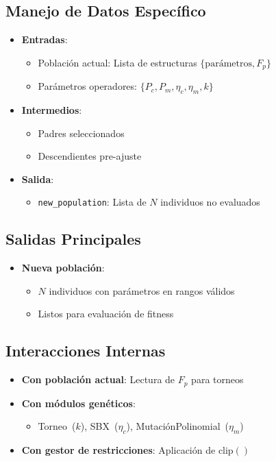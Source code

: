 \subsection*{Manejo de Datos Específico}
\begin{itemize}
    \item \textbf{Entradas}:
    \begin{itemize}
        \item Población actual: Lista de estructuras $\{\text{parámetros}, F_p\}$
        \item Parámetros operadores: $\{P_c, P_m, \eta_c, \eta_m, k\}$
    \end{itemize}

    \item \textbf{Intermedios}:
    \begin{itemize}
        \item Padres seleccionados
        \item Descendientes pre-ajuste
    \end{itemize}

    \item \textbf{Salida}:
    \begin{itemize}
        \item \texttt{new\_population}: Lista de $N$ individuos no evaluados
    \end{itemize}
\end{itemize}

\subsection*{Salidas Principales}
\begin{itemize}
    \item \textbf{Nueva población}:
    \begin{itemize}
        \item $N$ individuos con parámetros en rangos válidos
        \item Listos para evaluación de fitness
    \end{itemize}
\end{itemize}

\subsection*{Interacciones Internas}
\begin{itemize}
    \item \textbf{Con población actual}: Lectura de $F_p$ para torneos
    \item \textbf{Con módulos genéticos}:
    \begin{itemize}
        \item Torneo~($k$), SBX~($\eta_c$), MutaciónPolinomial~($\eta_m$)
    \end{itemize}
    \item \textbf{Con gestor de restricciones}: Aplicación de $\text{clip}()$
\end{itemize}

